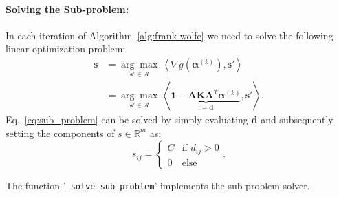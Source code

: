 \documentclass{article}
\newcommand{\defi}{:=}
\newcommand{\balpha}{\boldsymbol{\alpha}}
\newcommand{\bones}{\mathbf{1}}
\newcommand{\numpair}{m}
\begin{document}
\paragraph{Solving the Sub-problem:}
In each iteration of Algorithm~\ref{alg:frank-wolfe} we need to solve the following linear optimization problem:
\begin{align}
    \mathbf{s}
        &=\underset{\mathbf{s}'\in\mathcal{A}}{\arg\max}\,\left\langle\nabla g(\balpha^{(k)}),\mathbf{s}'\right\rangle\\
        &=\underset{\mathbf{s}'\in\mathcal{A}}{\arg\max}\,\left\langle\underbrace{\bones-\mathbf{A}\mathbf{K}\mathbf{A}^T\balpha^{(k)}}_{\defi\mathbf{d}},\mathbf{s}'\right\rangle.\label{eq:sub_problem}
\end{align}
Eq.~\eqref{eq:sub_problem} can be solved by simply evaluating $\mathbf{d}$ and subsequently setting the components of $s\in\mathbb{R}^{\numpair}$ as:
\begin{equation}
    s_{ij}=\begin{cases}
            C&\text{if }d_{ij}>0\\
            0&\text{else}
           \end{cases}.
\end{equation}
\begin{mdframed}[style=codeframe]
    The function '\texttt{\_solve\_sub\_problem}' implements the sub problem solver.
\end{mdframed}
\end{document}
